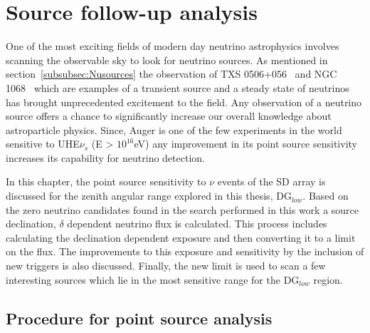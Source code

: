 
\chapter{Source follow-up analysis}
\label{chap:follow-up}

One of the most exciting fields of modern day neutrino astrophysics involves scanning the observable sky to look for neutrino sources. As mentioned in section~\ref{subsubsec:Nusources} the observation of TXS 0506+056~\cite{Icecube_txs} and NGC 1068~\cite{Icecube_2022} which are examples of a transient source and a steady state of neutrinos has brought unprecedented excitement to the field. Any observation of a neutrino source offers a chance to significantly increase our overall knowledge about astroparticle physics. Since, Auger is one of the few experiments in the world sensitive to UHE$\nu_s$ (E > $10^{16}$eV) any improvement in its point source sensitivity increases its capability for neutrino detection. 

In this chapter, the point source sensitivity to $\nu$ events of the SD array is discussed for the zenith angular range explored in this thesis, DG$_{low}$. Based on the zero neutrino candidates found in the search performed in this work a source declination, $\delta$ dependent neutrino flux is calculated. This process includes calculating the declination dependent exposure and then converting it to a limit on the flux. The improvements to this exposure and sensitivity by the inclusion of new triggers is also discussed. Finally, the new limit is used to scan a few interesting sources which lie in the most sensitive range for the DG$_{low}$ region.

\section{Procedure for point source analysis}
\label{sec:procedure_point_source}

